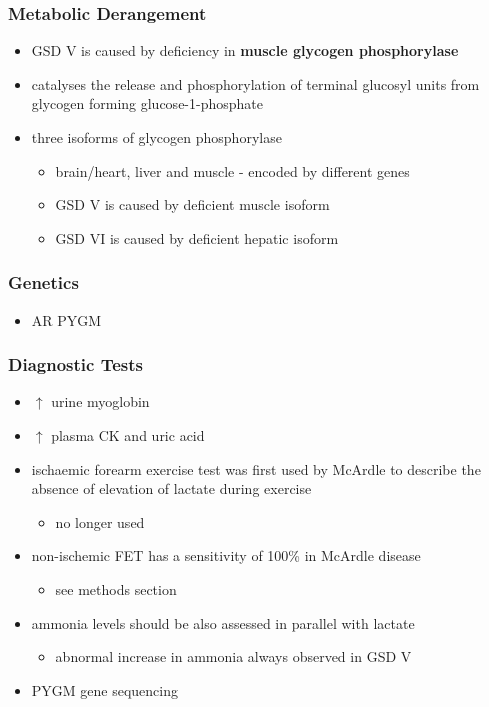 \documentclass[12pt]{scrartcl}
\begin{document}
\subsubsection{Metabolic Derangement}
\label{sec:org632189a}
\begin{itemize}
\item GSD V is caused by deficiency in \textbf{muscle glycogen phosphorylase}
\item catalyses the release and phosphorylation of terminal glucosyl units
from glycogen forming glucose-1-phosphate
\item three isoforms of glycogen phosphorylase
\begin{itemize}
\item brain/heart, liver and muscle - encoded by different genes
\item GSD V is caused by deficient muscle isoform
\item GSD VI is caused by deficient hepatic isoform
\end{itemize}
\end{itemize}

\subsubsection{Genetics}
\label{sec:orge6eb6f6}
\begin{itemize}
\item AR PYGM
\end{itemize}

\subsubsection{Diagnostic Tests}
\label{sec:org09252f0}
\begin{itemize}
\item \(\uparrow\) urine myoglobin
\item \(\uparrow\) plasma CK and uric acid
\item ischaemic forearm exercise test was first used by McArdle to
describe the absence of elevation of lactate during exercise
\begin{itemize}
\item no longer used
\end{itemize}
\item non-ischemic FET has a sensitivity of 100\% in McArdle disease
\begin{itemize}
\item see methods section
\end{itemize}
\item ammonia levels should be also assessed in parallel with lactate
\begin{itemize}
\item abnormal increase in ammonia always observed in GSD V
\end{itemize}
\item PYGM gene sequencing
\end{itemize}
\end{document}
